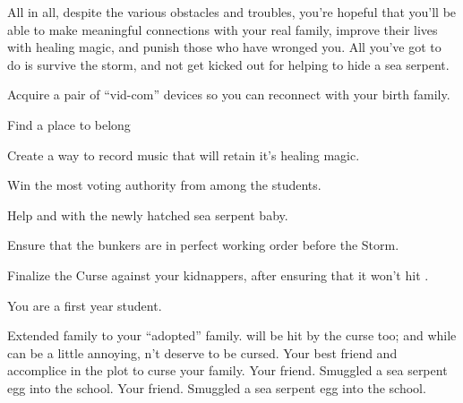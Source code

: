 \documentclass[char]{GL2020}
\begin{document}
All in all, despite the various obstacles and troubles, you’re hopeful that you’ll be able to make meaningful connections with your real family, improve their lives with healing magic, and punish those who have wronged you.  All you’ve got to do is survive the storm, and not get kicked out for helping to hide a sea serpent.

\begin{itemz}[Goals]
	\item Acquire a pair of ``vid-com'' devices so you can reconnect with your birth family.
	\item Find a place to belong
	\item Create a way to record music that will retain it's healing magic.
	\item Win the most voting authority from among the \pFarmers{} students.
	\item Help \cPirateChild{} and \cDisney{} with the newly hatched sea serpent baby.
	\item Ensure that the bunkers are in perfect working order before the Storm.
	\item Finalize the Curse against your kidnappers, after ensuring that it won't hit \cMusic{}.
\end{itemz}

\begin{itemz}[Notes]
	\item You are a first year student.
\end{itemz}

\begin{contacts}
	\contact{\cMusic{}} Extended family to your ``adopted'' family. \cMusic{\They} will be hit  by the curse too; and while \cMusic{} can be a little annoying, \cMusic{} \cMusic{\does}n’t deserve to be cursed.
	\contact{\cLibAssist{}} Your best friend and accomplice in the plot to curse your family.
	\contact{\cPirateChild{}} Your friend. Smuggled a sea serpent egg into the school.
	\contact{\cDisney{}} Your friend. Smuggled a sea serpent egg into the school.
\end{contacts}
\end{document}

